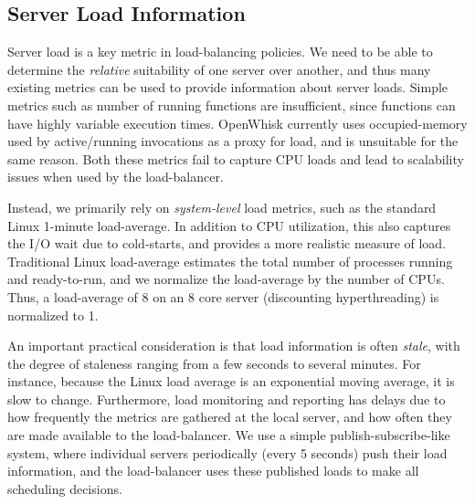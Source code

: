 \subsection{Server Load Information}

Server load is a key metric in load-balancing policies.
We need to be able to determine the \emph{relative} suitability of one server over another, and thus many existing metrics can be used to provide information about server loads.
%
Simple metrics such as number of running functions are insufficient, since functions can have highly variable execution times. 
OpenWhisk currently uses occupied-memory used by active/running invocations as a proxy for load, and is unsuitable for the same reason. 
Both these metrics fail to capture CPU loads and lead to scalability issues when used by the load-balancer. 




Instead, we primarily rely on \emph{system-level} load metrics, such as the standard Linux 1-minute load-average.
In addition to CPU utilization, this also captures the I/O wait due to cold-starts, and provides a more realistic measure of load.
Traditional Linux load-average estimates the total number of processes running and ready-to-run, and we normalize the load-average by the number of CPUs. 
Thus, a load-average of $8$ on an 8 core server (discounting hyperthreading) is normalized to 1. 

An important practical consideration is that load information is often \emph{stale}, with the degree of staleness ranging from a few seconds to several minutes. 
For instance, because the Linux load average is an exponential moving average, it is slow to change.
Furthermore, load monitoring and reporting has delays due to how frequently the metrics are gathered at the local server, and how often they are made available to the load-balancer.
We use a simple publish-subscribe-like system, where individual servers periodically (every 5 seconds) push their load information, and the load-balancer uses these published loads to make all scheduling decisions.


